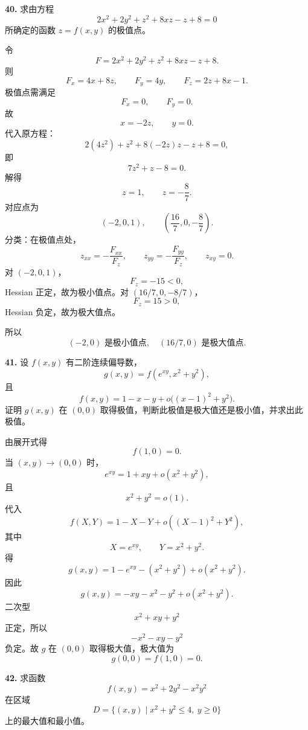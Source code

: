 \begin{problemblock}
\textbf{40.} 求由方程
\[
2x^2+2y^2+z^2+8xz-z+8=0
\]
所确定的函数 \(z=f(x,y)\) 的极值点。
\end{problemblock}

\begin{solutionblock}
令
\[
F=2x^2+2y^2+z^2+8xz-z+8.
\]
则
\[
F_x=4x+8z,\qquad F_y=4y,\qquad F_z=2z+8x-1.
\]
极值点需满足
\[
F_x=0,\qquad F_y=0.
\]
故
\[
x=-2z,\qquad y=0.
\]
代入原方程：
\[
2(4z^2)+z^2+8(-2z)z-z+8=0,
\]
即
\[
7z^2+z-8=0.
\]
解得
\[
z=1,\qquad z=-\frac87.
\]
对应点为
\[
(-2,0,1),\qquad \left(\frac{16}{7},0,-\frac87\right).
\]
分类：在极值点处，
\[
z_{xx}=-\frac{F_{xx}}{F_z},\qquad z_{yy}=-\frac{F_{yy}}{F_z},\qquad z_{xy}=0.
\]
对 \((-2,0,1)\)，
\[
F_z=-15<0,
\]
Hessian 正定，故为极小值点。对 \((16/7,0,-8/7)\)，
\[
F_z=15>0,
\]
Hessian 负定，故为极大值点。

所以
\[
\boxed{(-2,0)\text{ 是极小值点},\quad (16/7,0)\text{ 是极大值点}.}
\]
\end{solutionblock}

\begin{problemblock}
\textbf{41.} 设 \(f(x,y)\) 有二阶连续偏导数，
\[
g(x,y)=f(e^{xy},x^2+y^2),
\]
且
\[
f(x,y)=1-x-y+o\bigl((x-1)^2+y^2\bigr).
\]
证明 \(g(x,y)\) 在 \((0,0)\) 取得极值，判断此极值是极大值还是极小值，并求出此极值。
\end{problemblock}

\begin{solutionblock}
由展开式得
\[
f(1,0)=0.
\]
当 \((x,y)\to(0,0)\) 时，
\[
e^{xy}=1+xy+o(x^2+y^2),
\]
且
\[
x^2+y^2=o(1).
\]
代入
\[
f(X,Y)=1-X-Y+o((X-1)^2+Y^2),
\]
其中
\[
X=e^{xy},\qquad Y=x^2+y^2.
\]
得
\[
g(x,y)
=1-e^{xy}-(x^2+y^2)+o(x^2+y^2).
\]
因此
\[
g(x,y)
=-xy-x^2-y^2+o(x^2+y^2).
\]
二次型
\[
x^2+xy+y^2
\]
正定，所以
\[
-x^2-xy-y^2
\]
负定。故 \(g\) 在 \((0,0)\) 取得极大值，极大值为
\[
g(0,0)=f(1,0)=\boxed{0}.
\]
\end{solutionblock}

\begin{problemblock}
\textbf{42.} 求函数
\[
f(x,y)=x^2+2y^2-x^2y^2
\]
在区域
\[
D=\{(x,y)\mid x^2+y^2\le4,\ y\ge0\}
\]
上的最大值和最小值。
\end{problemblock}

